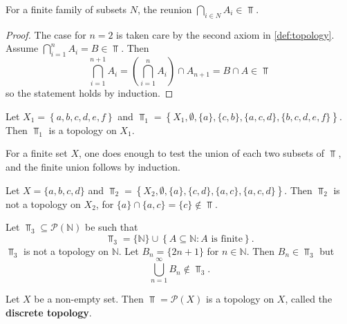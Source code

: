 \documentclass[../../main/main.tex]{subfiles}
\begin{document}
\begin{remark}
  For a finite family of subsets $N$, the reunion $\bigcap_{i \in N} A_{i} \in \Top$.
\end{remark}
\begin{proof}
  The case for $n = 2$ is taken care by the second axiom in \ref{def:topology}. Assume $\bigcap_{i=1}^{n} A_{i} = B \in \Top$. Then
  \begin{equation*}
    \bigcap_{i=1}^{n+1} A_{i} = \left(  \bigcap_{i=1}^{n} A_{i} \right) \cap A_{n+1} = B \cap A \in \Top
  \end{equation*}
  so the statement holds by induction.
\end{proof}

\begin{example}
  Let $X_{1} = \left\{ a, b, c, d, e, f \right\}$ and $\Top_{1} = \left\{ X_{1}, \emptyset, \{a\}, \{c, b\}, \{a, c, d\}, \{b, c, d, e, f\} \right\}$. Then $\Top_{1}$ is a topology on $X_{1}$.
\end{example}

\begin{remark}
  For a finite set $X$, one does enough to test the union of each two subsets of $\Top$, and the finite union follows by induction.
\end{remark}

\begin{example}
  Let $X = \{a, b, c, d\}$ and $\Top_{2} = \left\{ X_{2}, \emptyset, \{a\}, \{c, d\}, \{a, c\}, \{a, c, d\} \right\}$. Then $\Top_{2}$ is not a topology on $X_{2}$, for $\{a\} \cap \{a, c\} = \{c\} \notin \Top$.
\end{example}

\begin{example}
  Let $\Top_{3} \subseteq \mathcal{P}(\mathbb{N})$ be such that
  \begin{equation*}
    \Top_{3} = \{\mathbb{N}\} \cup \left\{ A \subseteq \mathbb{N} : A \text{ is finite} \right\}.
  \end{equation*}
  $\Top_{3}$ is not a topology on $\mathbb{N}$. Let $B_{n} = \{2 n + 1\}$ for $n \in \mathbb{N}$. Then $B_{n} \in \Top_{3}$ but
  \begin{equation*}
    \bigcup_{n = 1}^{\infty} B_{n} \notin \Top_{3}.
  \end{equation*}
\end{example}

\begin{definition}
  \label{def:discrete-topology}
  Let  $X$ be a non-empty set. Then $\Top = \mathcal{P}(X)$ is a topology on $X$, called the {\bf discrete topology}.
\end{definition}
\end{document}
